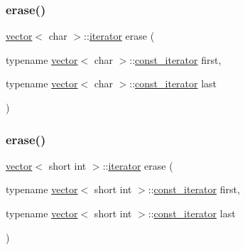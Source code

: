\subsubsection{\texorpdfstring{erase()}{erase()}\hspace{0.1cm}{\footnotesize\ttfamily [20/28]}}
{\footnotesize\ttfamily \mbox{\hyperlink{classvector}{vector}}$<$ char $>$\+::\mbox{\hyperlink{classvector_a35c955cacac6aacaa1e82874b1628865}{iterator}} erase (\begin{DoxyParamCaption}\item[{typename \mbox{\hyperlink{classvector}{vector}}$<$ char $>$\+::\mbox{\hyperlink{classvector_a2fc97dce62b7053449cc868607540dba}{const\+\_\+iterator}}}]{first,  }\item[{typename \mbox{\hyperlink{classvector}{vector}}$<$ char $>$\+::\mbox{\hyperlink{classvector_a2fc97dce62b7053449cc868607540dba}{const\+\_\+iterator}}}]{last }\end{DoxyParamCaption})}

\mbox{\label{classvector_a104682f71126f687d5905b198c093c57}} 
\subsubsection{\texorpdfstring{erase()}{erase()}\hspace{0.1cm}{\footnotesize\ttfamily [21/28]}}
{\footnotesize\ttfamily \mbox{\hyperlink{classvector}{vector}}$<$ short int $>$\+::\mbox{\hyperlink{classvector_a35c955cacac6aacaa1e82874b1628865}{iterator}} erase (\begin{DoxyParamCaption}\item[{typename \mbox{\hyperlink{classvector}{vector}}$<$ short int $>$\+::\mbox{\hyperlink{classvector_a2fc97dce62b7053449cc868607540dba}{const\+\_\+iterator}}}]{first,  }\item[{typename \mbox{\hyperlink{classvector}{vector}}$<$ short int $>$\+::\mbox{\hyperlink{classvector_a2fc97dce62b7053449cc868607540dba}{const\+\_\+iterator}}}]{last }\end{DoxyParamCaption})}

\mbox{\label{classvector_a7c1784bc0a504982dafeb7181871ae55}} 
